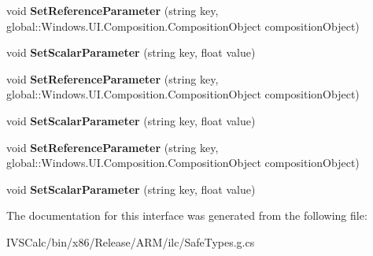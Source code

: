 \begin{DoxyCompactItemize}
void {\bfseries Set\+Reference\+Parameter} (string key, global\+::\+Windows.\+U\+I.\+Composition.\+Composition\+Object composition\+Object)
\item 
\mbox{\label{interface_windows_1_1_u_i_1_1_composition_1_1_i_composition_animation_af6355b211c24294fc2a8271392630abb}} 
void {\bfseries Set\+Scalar\+Parameter} (string key, float value)
\item 
\mbox{\label{interface_windows_1_1_u_i_1_1_composition_1_1_i_composition_animation_abecd5f2353d175d7382cc8388772d2e5}} 
void {\bfseries Set\+Reference\+Parameter} (string key, global\+::\+Windows.\+U\+I.\+Composition.\+Composition\+Object composition\+Object)
\item 
\mbox{\label{interface_windows_1_1_u_i_1_1_composition_1_1_i_composition_animation_af6355b211c24294fc2a8271392630abb}} 
void {\bfseries Set\+Scalar\+Parameter} (string key, float value)
\item 
\mbox{\label{interface_windows_1_1_u_i_1_1_composition_1_1_i_composition_animation_abecd5f2353d175d7382cc8388772d2e5}} 
void {\bfseries Set\+Reference\+Parameter} (string key, global\+::\+Windows.\+U\+I.\+Composition.\+Composition\+Object composition\+Object)
\item 
\mbox{\label{interface_windows_1_1_u_i_1_1_composition_1_1_i_composition_animation_af6355b211c24294fc2a8271392630abb}} 
void {\bfseries Set\+Scalar\+Parameter} (string key, float value)
\end{DoxyCompactItemize}


The documentation for this interface was generated from the following file\+:\begin{DoxyCompactItemize}
\item 
I\+V\+S\+Calc/bin/x86/\+Release/\+A\+R\+M/ilc/Safe\+Types.\+g.\+cs\end{DoxyCompactItemize}
